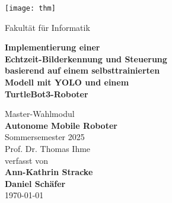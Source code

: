 
\begin{titlepage}

    \noindent\begin{minipage}{50mm}
         \texttt{[image: thm]}
    \end{minipage}
    \hfill
    \begin{minipage}{50mm}
        {\raggedleft Fakultät für Informatik \par}
    \end{minipage}
    \vspace*{2cm}

    \begin{center}
    \vspace{55mm}

    {\LARGE \bfseries Implementierung einer\\Echtzeit-Bilderkennung und Steuerung\\basierend auf einem selbsttrainierten\\Modell mit YOLO und einem\\TurtleBot3-Roboter\\}

    \vspace{28mm}

    {\large{Master-Wahlmodul}} \\[2mm]

    {\Large{\bfseries Autonome Mobile Roboter}} \\[2mm]

    {\Large{Sommersemester 2025}} \\[9mm]

    {\large{Prof. Dr. Thomas Ihme}}\\[8mm]

    \vfill
    {\large{verfasst von}}\\
    {\large{\bfseries Ann-Kathrin Stracke }}\\
    {\large{\bfseries Daniel Schäfer }}\\

    {\small{\today}}
    \end{center}

\end{titlepage}